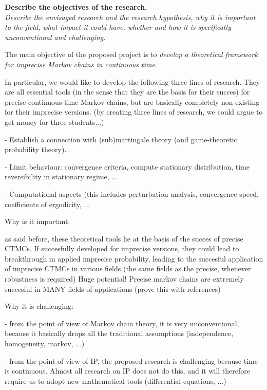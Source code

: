 \documentclass[11pt,dvipsnames,usenames,a4paper]{article}
\begin{document}
\vspace{3mm}

\textbf{Describe the objectives of the research.}\\
\textit{Describe the envisaged research and the research hypothesis, why it is important to the field, what impact it could have, whether and how it is specifically unconventional and challenging.}


The main objective of the proposed project is to \emph{develop a theoretical framework for imprecise Markov chains in continuous time}.

In particular, we would like to develop the following three lines of research. They are all essential tools (in the sense that they are the basis for their succes) for precise continuous-time Markov chains, but are basically completely non-existing for their imprecise versions. (by creating three lines of research, we could argue to get money for three students...)

- Establish a connection with (sub)martingale theory (and game-theoretic probability theory).

- Limit behaviour: convergence criteria, compute stationary distribution, time reversibility in stationary regime, ...

- Computational aspects (this includes perturbation analysis, convergence speed, coefficients of ergodicity, ...

Why is it important:

as said before, these theoretical tools lie at the basis of the succes of precise CTMCs. If succesfully developed for imprecise versions, they could lead to breakthrough in applied imprecise probability, leading to the succesful application of imprecise CTMCs in various fields (the same fields as the precise, whenever robustness is required) Huge potential! Precise markov chains are extremely succesful in MANY fields of applications (prove this with references)


Why it is challenging:

- from the point of view of Markov chain theory, it is very unconventional, because it basically drops all the traditional assumptions (independence, homogeneity, markov, ...)

- from the point of view of IP, the proposed research is challenging because time is continuous. Almost all research on IP does not do this, and it will therefore require us to adopt new mathematical tools (differential equations, ...)
\end{document}
